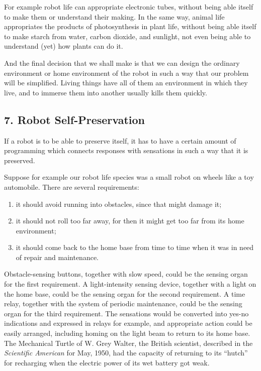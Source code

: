 \documentclass[11pt]{article}
\begin{document}
For example robot life can appropriate electronic tubes, without being able
itself to make them or understand their making. In the same way, animal life
appropriates the products of photosynthesis in plant life, without being able
itself to make starch from water, carbon dioxide, and sunlight, not even being
able to understand (yet) how plants can do it.

And the final decision that we shall make is that we can design the ordinary
environment or home environment of the robot in such a way that our problem
will be simplified. Living things have all of them an environment in which they
live, and to immerse them into another usually kills them quickly.

\subsection*{7. Robot Self-Preservation}

If a robot is to be able to preserve itself, it has to have a certain amount of
programming which connects responses with sensations in such a way that it is
preserved.

Suppose for example our robot life species was a small robot on wheels like a
toy automobile. There are several requirements:

\begin{enumerate}
\item it should avoid running into obstacles, since that might damage it;
\item it should not roll too far away, for then it might get too far from its
home environment;
\item it should come back to the home base from time to time when it was in
need of repair and maintenance.
\end{enumerate}

Obstacle-sensing buttons, together with slow speed, could be the sensing organ
for the first requirement. A light-intensity sensing device, together with a
light on the home base, could be the sensing organ for the second requirement.
A time relay, together with the system of periodic maintenance, could be the
sensing organ for the third requirement. The sensations would be converted into
yes-no indications and expressed in relays for example, and appropriate action
could be easily arranged, including homing on the light beam to return to its
home base. The Mechanical Turtle of W. Grey Walter, the British scientist,
described in the \emph{Scientific American} for May, 1950, had the capacity of
returning to its ``hutch'' for recharging when the electric power of its wet
battery got weak.
\end{document}
